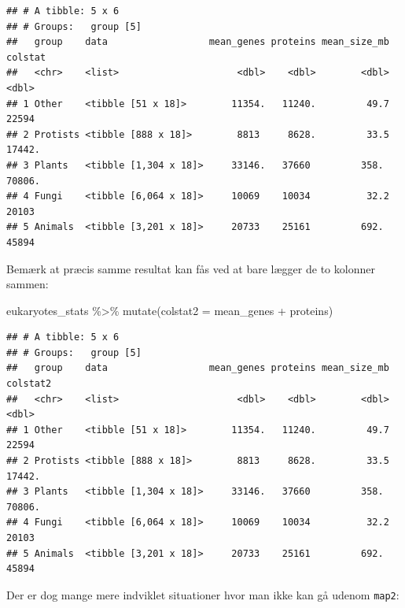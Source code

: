 \documentclass[
]{book}
\newenvironment{Shaded}{\begin{snugshade}}{\end{snugshade}}
\newcommand{\AttributeTok}[1]{\textcolor[rgb]{0.77,0.63,0.00}{#1}}
\newcommand{\FunctionTok}[1]{\textcolor[rgb]{0.00,0.00,0.00}{#1}}
\newcommand{\NormalTok}[1]{#1}
\newcommand{\SpecialCharTok}[1]{\textcolor[rgb]{0.00,0.00,0.00}{#1}}
\begin{document}
\begin{verbatim}
## # A tibble: 5 x 6
## # Groups:   group [5]
##   group    data                  mean_genes proteins mean_size_mb colstat
##   <chr>    <list>                     <dbl>    <dbl>        <dbl>   <dbl>
## 1 Other    <tibble [51 x 18]>        11354.   11240.         49.7  22594 
## 2 Protists <tibble [888 x 18]>        8813     8628.         33.5  17442.
## 3 Plants   <tibble [1,304 x 18]>     33146.   37660         358.   70806.
## 4 Fungi    <tibble [6,064 x 18]>     10069    10034          32.2  20103 
## 5 Animals  <tibble [3,201 x 18]>     20733    25161         692.   45894
\end{verbatim}

Bemærk at præcis samme resultat kan fås ved at bare lægger de to kolonner sammen:

\begin{Shaded}
\begin{Highlighting}[]
\NormalTok{eukaryotes\_stats }\SpecialCharTok{\%\textgreater{}\%} \FunctionTok{mutate}\NormalTok{(}\AttributeTok{colstat2 =}\NormalTok{ mean\_genes }\SpecialCharTok{+}\NormalTok{ proteins)}
\end{Highlighting}
\end{Shaded}

\begin{verbatim}
## # A tibble: 5 x 6
## # Groups:   group [5]
##   group    data                  mean_genes proteins mean_size_mb colstat2
##   <chr>    <list>                     <dbl>    <dbl>        <dbl>    <dbl>
## 1 Other    <tibble [51 x 18]>        11354.   11240.         49.7   22594 
## 2 Protists <tibble [888 x 18]>        8813     8628.         33.5   17442.
## 3 Plants   <tibble [1,304 x 18]>     33146.   37660         358.    70806.
## 4 Fungi    <tibble [6,064 x 18]>     10069    10034          32.2   20103 
## 5 Animals  <tibble [3,201 x 18]>     20733    25161         692.    45894
\end{verbatim}

Der er dog mange mere indviklet situationer hvor man ikke kan gå udenom \texttt{map2}:
\end{document}
